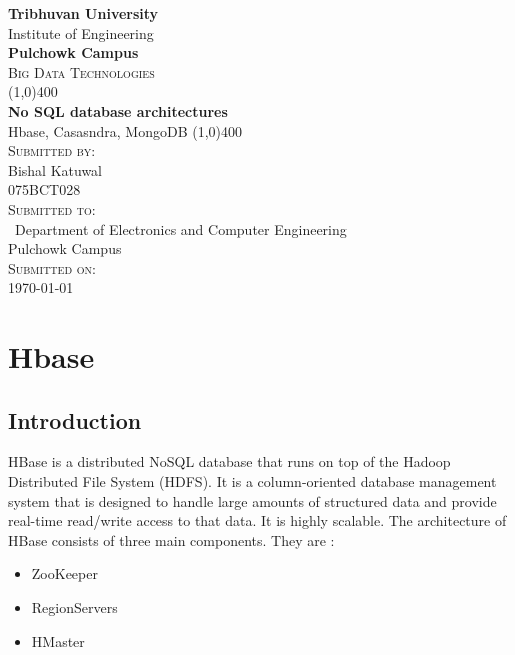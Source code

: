 \documentclass[12pt]{article}
\begin{document}
\begin{titlepage}
    \begin{center}
        \huge{\bfseries  Tribhuvan University}\\
        \Large{Institute of Engineering}\\
        \huge{ \bfseries  Pulchowk Campus}\\[3.2cm]


        \textsc{\Large Big Data Technologies}\\[-0.5cm]
        \line(1,0){400}\\
        \huge{\bfseries No SQL database architectures}\\
        \large{Hbase, Casasndra, MongoDB}
        \line(1,0){400}\\


        \textsc{\Large Submitted by:}\\
        \Large Bishal Katuwal\\ \large 075BCT028\\    [0.85cm]

        \textsc{\Large Submitted to:}\\\
        \large Department of Electronics and Computer Engineering\\Pulchowk Campus\\    [0.85cm]
        
        \textsc{\Large Submitted on:}\\
        \today
        
    \end{center}
\end{titlepage}
\pagebreak
\section{Hbase}
\subsection{Introduction}
HBase is a distributed NoSQL database that runs on top of the Hadoop Distributed File System (HDFS). It is a column-oriented database management system that is designed to handle large amounts of structured data and provide real-time read/write access to that data. It is highly scalable. The architecture of HBase consists of three main components. They are : 
\begin{itemize}
    \item ZooKeeper
    \item RegionServers
    \item HMaster
\end{itemize}
 
\end{document}
